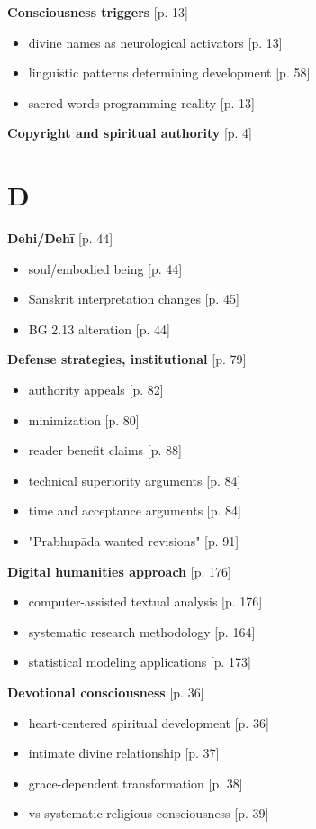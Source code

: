 \documentclass[11pt,twoside]{book}
\begin{document}
\textbf{\textbf{Consciousness triggers}} {[}p. 13]
\begin{itemize}
\item divine names as neurological activators [p. 13]
\item linguistic patterns determining development [p. 58]
\item sacred words programming reality [p. 13]
\end{itemize}

\textbf{\textbf{Copyright and spiritual authority}} {[}p. 4]
\section*{D}
\label{sec:org92e1cc6}

\textbf{\textbf{Dehi/Dehī}} {[}p. 44]
\begin{itemize}
\item soul/embodied being [p. 44]
\item Sanskrit interpretation changes [p. 45]
\item BG 2.13 alteration [p. 44]
\end{itemize}

\textbf{\textbf{Defense strategies, institutional}} {[}p. 79]
\begin{itemize}
\item authority appeals [p. 82]
\item minimization [p. 80]
\item reader benefit claims [p. 88]
\item technical superiority arguments [p. 84]
\item time and acceptance arguments [p. 84]
\item "Prabhupāda wanted revisions" [p. 91]
\end{itemize}

\textbf{\textbf{Digital humanities approach}} {[}p. 176]
\begin{itemize}
\item computer-assisted textual analysis [p. 176]
\item systematic research methodology [p. 164]
\item statistical modeling applications [p. 173]
\end{itemize}

\textbf{\textbf{Devotional consciousness}} {[}p. 36]
\begin{itemize}
\item heart-centered spiritual development [p. 36]
\item intimate divine relationship [p. 37]
\item grace-dependent transformation [p. 38]
\item vs systematic religious consciousness [p. 39]
\end{itemize}
\end{document}
